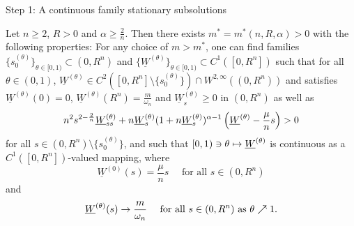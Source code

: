 \begin{frame}{Step 1: A continuous family stationary subsolutions}
\begin{lemma}
	Let $n\geqslant 2$, $R>0$ and $\alpha\geqslant\frac2n$. Then there exists $m^* = m^*(n, R, \alpha) > 0$ with the following properties: For any choice of $m > m^*$, one can find families $\{s_0^{(\theta)}\}_{\theta\in[0,1)}\subset(0, R^n)$ and $\{\underline{W}^{(\theta)}\}_{\theta\in[0,1)}\subset C^1([0, R^n])$ such that for all $\theta\in(0,1)$, 
$\underline{W}^{(\theta)} \in C^2([0, R^n]\setminus \{s_0^{(\theta)}\})\cap W^{2, \infty}((0, R^n))$
and satisfies $\underline{W}^{(\theta)}(0) = 0$, $\underline{W}^{(\theta)}(R^n) = \frac{m}{\omega_n}$ and $\underline{W}_s^{(\theta)}\geqslant 0$ in $(0, R^n)$ as well as
	\begin{equation}\label{subsolution equation}
		n^2s^{2-\frac2n}\underline{W}_{ss}^{(\theta)} + n\underline{W}^{(\theta)}_s(1 + n\underline{W}^{(\theta)}_s)^{\alpha-1} \left(\underline{W}^{(\theta)} - \frac{\mu}{n}s\right) > 0
	\end{equation}
for all  $s\in(0, R^n)\setminus \{ s_0^{(\theta)}\}$, 	and such that $[0, 1) \ni \theta \mapsto \underline{W}^{(\theta)} $ is continuous as a $C^1([0, R^n])$-valued mapping, where
	\begin{equation}\nonumber
		\underline{W}^{(0)}(s) = \frac{\mu}{n}s \quad\text{ for all } s\in(0, R^n)
	\end{equation}
    and
	\begin{equation}\nonumber
		\underline{W}^{(\theta)} (s) \rightarrow \frac{m}{\omega_n} \quad\text{ for all } s\in(0, R^n)  \text{ as } \theta\nearrow 1.
	\end{equation}
\end{lemma}
\end{frame}



